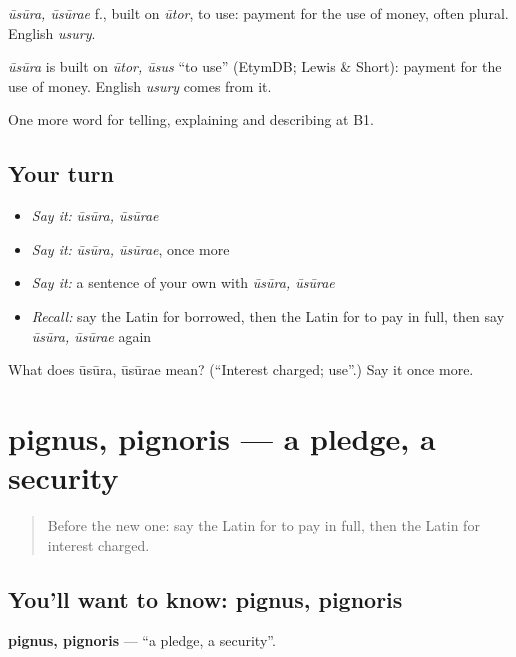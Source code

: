 \emph{ūsūra, ūsūrae} f., built on \emph{ūtor}, to use: payment for the use of money, often plural. English \emph{usury}.

\begin{cousinweb}
\emph{ūsūra} is built on \emph{ūtor, ūsus} \textquotedblleft{}to use\textquotedblright{} (EtymDB; Lewis \& Short): payment for the use of money. English \emph{usury} comes from it.
\end{cousinweb}

\begin{grammarlens}[title={What you've built}]
One more word for telling, explaining and describing at B1.
\end{grammarlens}

\subsection*{Your turn}
\begin{itemize}
\raggedright
  \item \emph{Say it:} \emph{ūsūra, ūsūrae}
  \item \emph{Say it:} \emph{ūsūra, ūsūrae}, once more
  \item \emph{Say it:} a sentence of your own with \emph{ūsūra, ūsūrae}
  \item \emph{Recall:} say the Latin for borrowed, then the Latin for to pay in full, then say \emph{ūsūra, ūsūrae} again
\end{itemize}

\begin{tcolorbox}[breakable,colback=teal!4,colframe=teal!35!black,title={Before you move on}]
What does ūsūra, ūsūrae mean? (\textquotedblleft{}Interest charged; use\textquotedblright{}.) Say it once more.
\end{tcolorbox}
\section[pignus, pignoris]{pignus, pignoris — a pledge, a security}

\label{lesson:LA-C419-pignus}



\begin{quote}
Before the new one: say the Latin for to pay in full, then the Latin for interest charged.
\end{quote}

\subsection*{You'll want to know: pignus, pignoris}
\textbf{pignus, pignoris} — \textquotedblleft{}a pledge, a security\textquotedblright{}.

